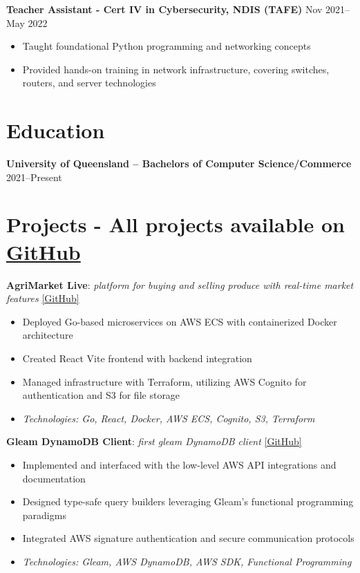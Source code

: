 \documentclass[10pt,a4paper]{article}
\begin{document}
	\textbf{Teacher Assistant - Cert IV in Cybersecurity, NDIS (TAFE)} \hfill Nov 2021--May 2022 
	\begin{itemize}[label=\textbullet, itemsep=0.02cm]
		\item Taught foundational Python programming and networking concepts
		\item Provided hands-on training in network infrastructure, covering switches, routers, and server technologies
	\end{itemize}
	
	\section{Education}
	\textbf{University of Queensland -- Bachelors of Computer Science/Commerce} \hfill 2021--Present \\	
	\section{Projects -  \textbf{All projects available on} \href{https://github.com/CameronBadman}{GitHub} }
	
	\textbf{AgriMarket Live}: \textit{platform for buying and selling produce with real-time market features} \href{https://github.com/CSSE6400/2025_P3_AgriMarket}{[GitHub]}
	\begin{itemize}[label=\textbullet, itemsep=0.05cm]
		\item Deployed Go-based microservices on AWS ECS with containerized Docker architecture
		\item Created React Vite frontend with backend integration
		\item Managed infrastructure with Terraform, utilizing AWS Cognito for authentication and S3 for file storage
		\item \textit{Technologies: Go, React, Docker, AWS ECS, Cognito, S3, Terraform}
	\end{itemize}
	
	
	\textbf{Gleam DynamoDB Client}: \textit{first gleam DynamoDB client} \href{https://github.com/CameronBadman/gleam-dynamodb}{[GitHub]}
	\begin{itemize}[label=\textbullet, itemsep=0.05cm]
		\item Implemented and interfaced with the low-level AWS API integrations and documentation
		\item Designed type-safe query builders leveraging Gleam's functional programming paradigms
		\item Integrated AWS signature authentication and secure communication protocols
		\item \textit{Technologies: Gleam, AWS DynamoDB, AWS SDK, Functional Programming}
	\end{itemize}
	
\end{document}
